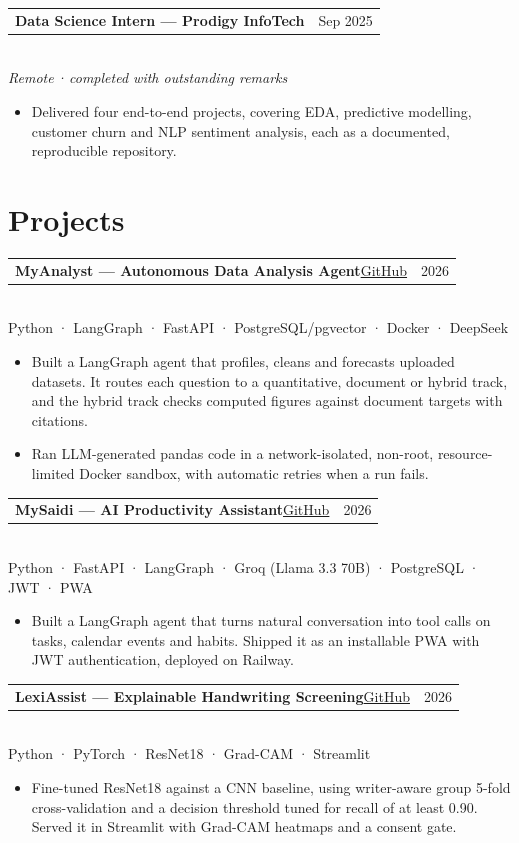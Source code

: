\documentclass[10pt,a4paper]{article}
\makeatletter
\newcommand{\meta}[1]{{\color{muted}#1}}
\newcommand{\entry}[3]{%
  \begin{tabularx}{\linewidth}{@{}X r@{}}
    {\fontsize{10.5}{12.5}\selectfont\bfseries #1} & \meta{#2} \\
  \end{tabularx}\\[-1pt]
  {\color{muted}\itshape #3}\par
}
\newcommand{\project}[5]{%
  \begin{tabularx}{\linewidth}{@{}X r@{}}
    {\fontsize{10.5}{12.5}\selectfont\bfseries #1}\hspace{0.5em}\href{#3}{\color{accent}\small #2} & \meta{#4} \\
  \end{tabularx}\\[-1pt]
  {\color{muted}\small #5}\par
}
\makeatother
\begin{document}
\vspace{4pt}
\entry{Data Science Intern — Prodigy InfoTech}{Sep 2025}{Remote\,·\,completed with outstanding remarks}
\begin{itemize}
  \item Delivered four end-to-end projects, covering EDA, predictive modelling, customer churn and NLP sentiment analysis, each as a documented, reproducible repository.
\end{itemize}

\section{Projects}

\project{MyAnalyst — Autonomous Data Analysis Agent}{GitHub}{https://github.com/Calvin-Gacheru/Automated-Junior-Analyst}{2026}
  {Python · LangGraph · FastAPI · PostgreSQL/pgvector · Docker · DeepSeek}
\begin{itemize}
  \item Built a LangGraph agent that profiles, cleans and forecasts uploaded datasets. It routes each question to a quantitative, document or hybrid track, and the hybrid track checks computed figures against document targets with citations.
  \item Ran LLM-generated pandas code in a network-isolated, non-root, resource-limited Docker sandbox, with automatic retries when a run fails.
\end{itemize}

\vspace{3pt}
\project{MySaidi — AI Productivity Assistant}{GitHub}{https://github.com/Calvin-Gacheru/MySaidi}{2026}
  {Python · FastAPI · LangGraph · Groq (Llama 3.3 70B) · PostgreSQL · JWT · PWA}
\begin{itemize}
  \item Built a LangGraph agent that turns natural conversation into tool calls on tasks, calendar events and habits. Shipped it as an installable PWA with JWT authentication, deployed on Railway.
\end{itemize}

\vspace{3pt}
\project{LexiAssist — Explainable Handwriting Screening}{GitHub}{https://github.com/Calvin-Gacheru/LexiAssist}{2026}
  {Python · PyTorch · ResNet18 · Grad-CAM · Streamlit}
\begin{itemize}
  \item Fine-tuned ResNet18 against a CNN baseline, using writer-aware group 5-fold cross-validation and a decision threshold tuned for recall of at least 0.90. Served it in Streamlit with Grad-CAM heatmaps and a consent gate.
\end{itemize}
\end{document}
